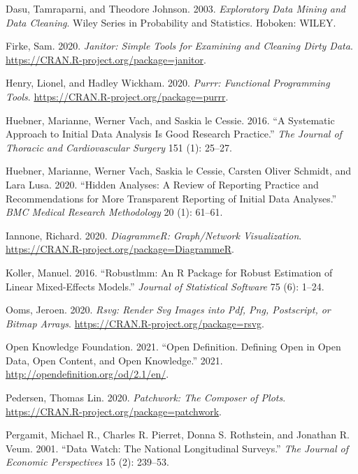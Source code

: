 \documentclass{article}
\begin{document}
\leavevmode\hypertarget{ref-DasuTamraparni2003Edma}{}%
Dasu, Tamraparni, and Theodore Johnson. 2003. \emph{Exploratory Data Mining and Data Cleaning}. Wiley Series in Probability and Statistics. Hoboken: WILEY.

\leavevmode\hypertarget{ref-janitor}{}%
Firke, Sam. 2020. \emph{Janitor: Simple Tools for Examining and Cleaning Dirty Data}. \url{https://CRAN.R-project.org/package=janitor}.

\leavevmode\hypertarget{ref-purrr}{}%
Henry, Lionel, and Hadley Wickham. 2020. \emph{Purrr: Functional Programming Tools}. \url{https://CRAN.R-project.org/package=purrr}.

\leavevmode\hypertarget{ref-HuebnerMariannePhD2016Asat}{}%
Huebner, Marianne, Werner Vach, and Saskia le Cessie. 2016. ``A Systematic Approach to Initial Data Analysis Is Good Research Practice.'' \emph{The Journal of Thoracic and Cardiovascular Surgery} 151 (1): 25--27.

\leavevmode\hypertarget{ref-HuebnerMarianne2020Haar}{}%
Huebner, Marianne, Werner Vach, Saskia le Cessie, Carsten Oliver Schmidt, and Lara Lusa. 2020. ``Hidden Analyses: A Review of Reporting Practice and Recommendations for More Transparent Reporting of Initial Data Analyses.'' \emph{BMC Medical Research Methodology} 20 (1): 61--61.

\leavevmode\hypertarget{ref-DiagrammeR}{}%
Iannone, Richard. 2020. \emph{DiagrammeR: Graph/Network Visualization}. \url{https://CRAN.R-project.org/package=DiagrammeR}.

\leavevmode\hypertarget{ref-KollerManuel2016rARP}{}%
Koller, Manuel. 2016. ``Robustlmm: An R Package for Robust Estimation of Linear Mixed-Effects Models.'' \emph{Journal of Statistical Software} 75 (6): 1--24.

\leavevmode\hypertarget{ref-rsvg}{}%
Ooms, Jeroen. 2020. \emph{Rsvg: Render Svg Images into Pdf, Png, Postscript, or Bitmap Arrays}. \url{https://CRAN.R-project.org/package=rsvg}.

\leavevmode\hypertarget{ref-opendata}{}%
Open Knowledge Foundation. 2021. ``Open Definition. Defining Open in Open Data, Open Content, and Open Knowledge.'' 2021. \url{http://opendefinition.org/od/2.1/en/}.

\leavevmode\hypertarget{ref-patchwork}{}%
Pedersen, Thomas Lin. 2020. \emph{Patchwork: The Composer of Plots}. \url{https://CRAN.R-project.org/package=patchwork}.

\leavevmode\hypertarget{ref-MichaelRPergamit2001DWTN}{}%
Pergamit, Michael R., Charles R. Pierret, Donna S. Rothstein, and Jonathan R. Veum. 2001. ``Data Watch: The National Longitudinal Surveys.'' \emph{The Journal of Economic Perspectives} 15 (2): 239--53.
\end{document}
